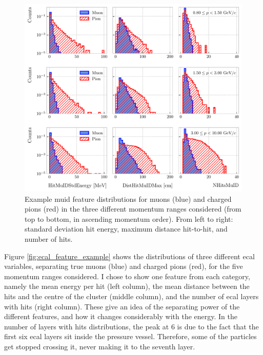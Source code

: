 \begin{figure}[t]
	\centering
	\includegraphics[width=.95\linewidth]{Images/GArSoft_PID/BDT/muid_feature_distribution_all_example.pdf}
	\caption[Example \gls{muid} feature distributions for muons and charged pions in the three different momentum ranges considered.]{Example \gls{muid} feature distributions for muons (blue) and charged pions (red) in the three different momentum ranges considered (from top to bottom, in ascending momentum order). From left to right: standard deviation hit energy, maximum distance hit-to-hit, and number of hits.}
	\label{fig:muid_feature_example}
\end{figure}

Figure \ref{fig:ecal_feature_example} shows the distributions of three different \gls{ecal} variables, separating true muons (blue) and charged pions (red), for the five momentum ranges considered. I chose to show one feature from each category, namely the mean energy per hit (left column), the mean distance between the hits and the centre of the cluster (middle column), and the number of \gls{ecal} layers with hits (right column). These give an idea of the separating power of the different features, and how it changes considerably with the energy. In the number of layers with hits distributions, the peak at $6$ is due to the fact that the first six \gls{ecal} layers sit inside the pressure vessel. Therefore, some of the particles get stopped crossing it, never making it to the seventh layer.

